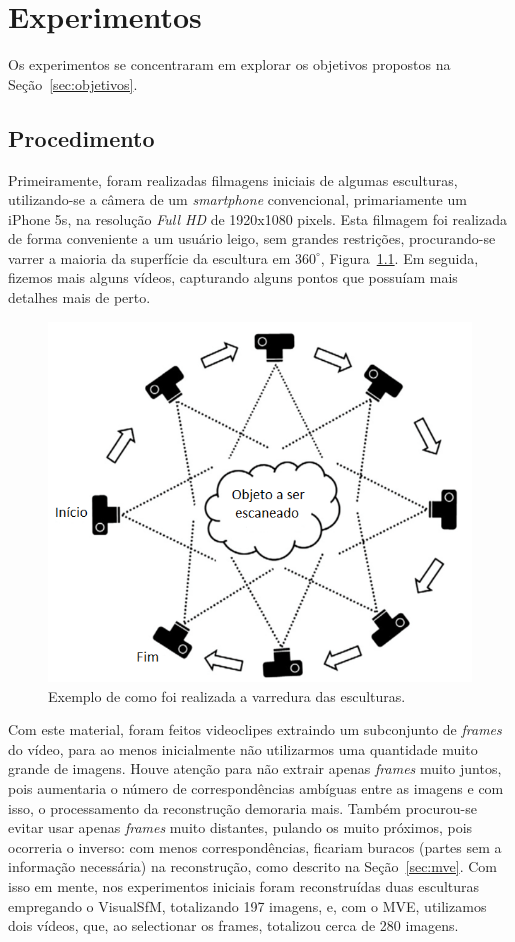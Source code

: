 \chapter{Experimentos}\label{sec:experiments}
Os experimentos se concentraram em explorar os objetivos propostos na Seção~\ref{sec:objetivos}.

\section{Procedimento}
Primeiramente, foram realizadas filmagens iniciais de algumas esculturas,
utilizando-se a câmera de um \emph{smartphone} convencional, primariamente um
iPhone 5s, na resolução \emph{Full HD} de 1920x1080 pixels. Esta filmagem foi realizada de
forma conveniente a um usuário leigo, sem grandes restrições, procurando-se
varrer a maioria da superfície da escultura em $360^{\circ}$,
Figura~\ref{fig:procedimentoscan}.  Em seguida, fizemos mais alguns vídeos,
capturando alguns pontos que possuíam mais detalhes mais de perto.

\begin{figure}[!h]
	\centering
	\includegraphics[width=0.4\linewidth]{figs/procedimentoscan.png}
	\caption{%
	Exemplo de como foi realizada a varredura das esculturas.
	}\label{fig:procedimentoscan}
\end{figure}

Com este material, foram feitos videoclipes extraindo um subconjunto de
\emph{frames} do vídeo, para ao menos inicialmente não utilizarmos uma quantidade muito
grande de imagens. Houve atenção para não extrair apenas \emph{frames} muito
juntos, pois aumentaria o número de correspondências ambíguas entre as imagens e
com isso, o processamento da reconstrução demoraria mais. Também procurou-se 
evitar usar apenas \emph{frames} muito distantes, pulando os muito próximos,
pois ocorreria o inverso: com menos
correspondências, ficariam buracos (partes sem a informação necessária) na
reconstrução, como descrito na Seção~\ref{sec:mve}.
Com isso em mente, nos experimentos iniciais foram reconstruídas duas esculturas
empregando o VisualSfM, totalizando 197 imagens, 
%
%
e, com o MVE, utilizamos dois vídeos, que, ao selectionar os frames, totalizou cerca de 280
imagens.
%


